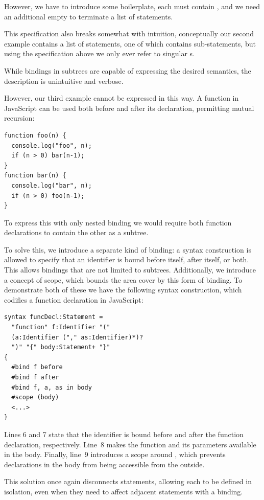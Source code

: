 \documentclass{kththesis}
\begin{document}
However, we have to introduce some boilerplate, each  must contain , and we need an additional empty  to terminate a list of statements.

This specification also breaks somewhat with intuition, conceptually our second example contains a list of statements, one of which contains sub-statements, but using the specification above we only ever refer to singular s.

While bindings in subtrees are capable of expressing the desired semantics, the description is unintuitive and verbose.

However, our third example cannot be expressed in this way. A function in JavaScript can be used both before and after its declaration, permitting mutual recursion:

\begin{verbatim}
function foo(n) {
  console.log("foo", n);
  if (n > 0) bar(n-1);
}
function bar(n) {
  console.log("bar", n);
  if (n > 0) foo(n-1);
}
\end{verbatim}

To express this with only nested binding we would require both function declarations to contain the other as a subtree.

To solve this, we introduce a separate kind of binding: a syntax construction is allowed to specify that an identifier is bound before itself, after itself, or both. This allows bindings that are not limited to subtrees. Additionally, we introduce a concept of scope, which bounds the area cover by this form of binding. To demonstrate both of these we have the following syntax construction, which codifies a function declaration in JavaScript:

\begin{verbatim}
syntax funcDecl:Statement =
  "function" f:Identifier "("
  (a:Identifier ("," as:Identifier)*)?
  ")" "{" body:Statement+ "}"
{
  #bind f before
  #bind f after
  #bind f, a, as in body
  #scope (body)
  <...>
}
\end{verbatim}

Lines 6 and 7 state that the identifier  is bound before and after the function declaration, respectively. Line~8 makes the function and its parameters available in the body. Finally, line~9 introduces a scope around , which prevents declarations in the body from being accessible from the outside.

This solution once again disconnects statements, allowing each to be defined in isolation, even when they need to affect adjacent statements with a binding.
\end{document}
